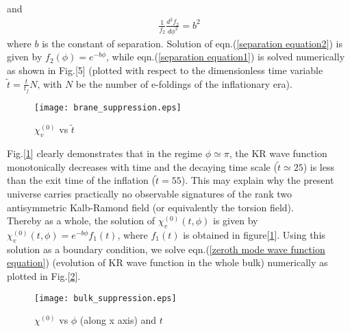 \documentclass[a4paper]{article}
\begin{document}
and
\begin{eqnarray}
 \frac{1}{f_2}\frac{d^2f_2}{d\phi^2} = b^2
 \label{separation equation2}
\end{eqnarray}
where $b$ is the constant of separation. Solution of eqn.(\ref{separation equation2}) is given by $f_2(\phi) = e^{-b\phi}$, while 
eqn.(\ref{separation equation1}) is solved numerically as shown in Fig.[5] (plotted with respect to the dimensionless time variable 
$\tilde{t}=\frac{t}{t_f}N$, with $N$ be the number of e-foldings of the inflationary era).\\

\begin{figure}[!h]
\begin{center}
 \centering
 \texttt{[image: brane\_suppression.eps]}
 \caption{$\chi_v^{(0)}$ vs $\tilde{t}$}
 \label{plot KR wave function1}
\end{center}
\end{figure}

Fig.[\ref{plot KR wave function1}] clearly demonstrates that in the regime $\phi \simeq \pi$, the KR wave 
function monotonically decreases with time and 
the decaying time scale ($\tilde{t}\simeq 25$) is less than the exit time of the inflation ($\tilde{t} = 55$). This may explain 
why the present universe carries practically no observable signatures of the rank two antisymmetric Kalb-Ramond field (or 
equivalently the torsion field).\\
Thereby as a whole, the solution of $\chi_v^{(0)}(t,\phi)$ is given by $\chi_v^{(0)}(t,\phi) = e^{-b\phi}f_1(t)$, where $f_1(t)$ is 
obtained in figure[\ref{plot KR wave function1}]. 
Using this solution as a boundary condition, we solve eqn.(\ref{zeroth mode wave function equation}) (evolution of KR wave function 
in the whole bulk) numerically as plotted in Fig.[\ref{plot KR wave function2}].\\


\begin{figure}[!h]
\begin{center}
 \centering
 \texttt{[image: bulk\_suppression.eps]}
 \caption{$\chi^{(0)}$ vs $\phi$ (along x axis) and $t$}
 \label{plot KR wave function2}
\end{center}
\end{figure}
\end{document}
